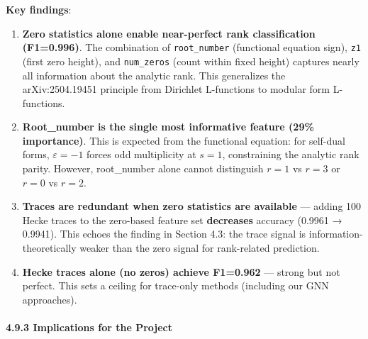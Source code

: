 \documentclass[
]{article}
\begin{document}
\textbf{Key findings}:

\begin{enumerate}
\def\labelenumi{\arabic{enumi}.}
\item
  \textbf{Zero statistics alone enable near-perfect rank classification
  (F1=0.996)}. The combination of \texttt{root\_number} (functional
  equation sign), \texttt{z1} (first zero height), and
  \texttt{num\_zeros} (count within fixed height) captures nearly all
  information about the analytic rank. This generalizes the
  arXiv:2504.19451 principle from Dirichlet L-functions to modular form
  L-functions.
\item
  \textbf{Root\_number is the single most informative feature (29\%
  importance)}. This is expected from the functional equation: for
  self-dual forms, \(\varepsilon = -1\) forces odd multiplicity at
  \(s=1\), constraining the analytic rank parity. However, root\_number
  alone cannot distinguish \(r=1\) vs \(r=3\) or \(r=0\) vs \(r=2\).
\item
  \textbf{Traces are redundant when zero statistics are available} ---
  adding 100 Hecke traces to the zero-based feature set
  \textbf{decreases} accuracy (0.9961 → 0.9941). This echoes the finding
  in Section 4.3: the trace signal is information-theoretically weaker
  than the zero signal for rank-related prediction.
\item
  \textbf{Hecke traces alone (no zeros) achieve F1=0.962} --- strong but
  not perfect. This sets a ceiling for trace-only methods (including our
  GNN approaches).
\end{enumerate}

\hypertarget{implications-for-the-project}{%
\paragraph{4.9.3 Implications for the
Project}\label{implications-for-the-project}}
\end{document}
